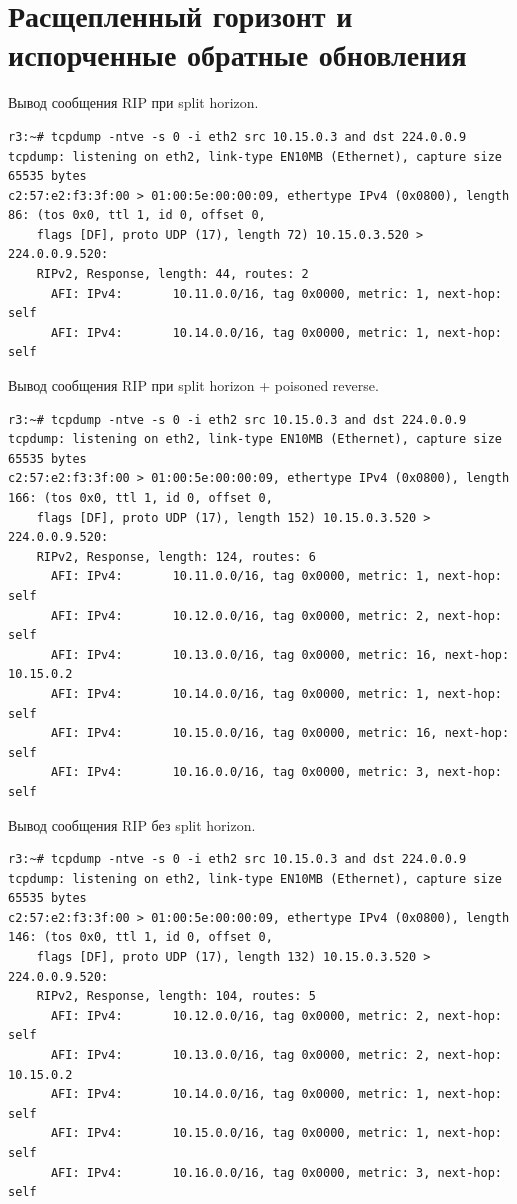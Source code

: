 \documentclass[a4paper,12pt]{article}
\begin{document}
\section{Расщепленный горизонт и испорченные обратные обновления}

Вывод сообщения RIP при split horizon.

\begin{Verbatim}
r3:~# tcpdump -ntve -s 0 -i eth2 src 10.15.0.3 and dst 224.0.0.9
tcpdump: listening on eth2, link-type EN10MB (Ethernet), capture size 65535 bytes
c2:57:e2:f3:3f:00 > 01:00:5e:00:00:09, ethertype IPv4 (0x0800), length 86: (tos 0x0, ttl 1, id 0, offset 0,
    flags [DF], proto UDP (17), length 72) 10.15.0.3.520 > 224.0.0.9.520: 
	RIPv2, Response, length: 44, routes: 2
	  AFI: IPv4:       10.11.0.0/16, tag 0x0000, metric: 1, next-hop: self
	  AFI: IPv4:       10.14.0.0/16, tag 0x0000, metric: 1, next-hop: self
\end{Verbatim}

Вывод сообщения RIP при split horizon + poisoned reverse.

\begin{Verbatim}
r3:~# tcpdump -ntve -s 0 -i eth2 src 10.15.0.3 and dst 224.0.0.9
tcpdump: listening on eth2, link-type EN10MB (Ethernet), capture size 65535 bytes
c2:57:e2:f3:3f:00 > 01:00:5e:00:00:09, ethertype IPv4 (0x0800), length 166: (tos 0x0, ttl 1, id 0, offset 0,
    flags [DF], proto UDP (17), length 152) 10.15.0.3.520 > 224.0.0.9.520: 
	RIPv2, Response, length: 124, routes: 6
	  AFI: IPv4:       10.11.0.0/16, tag 0x0000, metric: 1, next-hop: self
	  AFI: IPv4:       10.12.0.0/16, tag 0x0000, metric: 2, next-hop: self
	  AFI: IPv4:       10.13.0.0/16, tag 0x0000, metric: 16, next-hop: 10.15.0.2
	  AFI: IPv4:       10.14.0.0/16, tag 0x0000, metric: 1, next-hop: self
	  AFI: IPv4:       10.15.0.0/16, tag 0x0000, metric: 16, next-hop: self
	  AFI: IPv4:       10.16.0.0/16, tag 0x0000, metric: 3, next-hop: self
\end{Verbatim}

Вывод сообщения RIP без split horizon.

\begin{Verbatim}
r3:~# tcpdump -ntve -s 0 -i eth2 src 10.15.0.3 and dst 224.0.0.9
tcpdump: listening on eth2, link-type EN10MB (Ethernet), capture size 65535 bytes
c2:57:e2:f3:3f:00 > 01:00:5e:00:00:09, ethertype IPv4 (0x0800), length 146: (tos 0x0, ttl 1, id 0, offset 0,
    flags [DF], proto UDP (17), length 132) 10.15.0.3.520 > 224.0.0.9.520: 
	RIPv2, Response, length: 104, routes: 5
	  AFI: IPv4:       10.12.0.0/16, tag 0x0000, metric: 2, next-hop: self
	  AFI: IPv4:       10.13.0.0/16, tag 0x0000, metric: 2, next-hop: 10.15.0.2
	  AFI: IPv4:       10.14.0.0/16, tag 0x0000, metric: 1, next-hop: self
	  AFI: IPv4:       10.15.0.0/16, tag 0x0000, metric: 1, next-hop: self
	  AFI: IPv4:       10.16.0.0/16, tag 0x0000, metric: 3, next-hop: self
\end{Verbatim}
\end{document}
